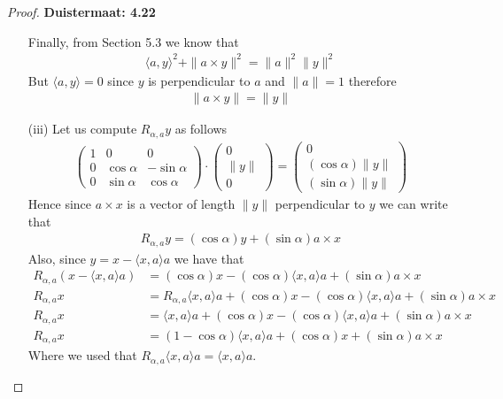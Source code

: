 \documentclass[11pt]{article}
\theoremstyle{definition}
\begin{document}
\begin{proof}{\textbf{Duistermaat: 4.22}}
\begin{itemize}
    Finally, from Section 5.3 we know that
    \begin{align*}
        \langle a, y \rangle^2 + \|a \times y\|^2 = \|a\|^2\|y\|^2
    \end{align*}
    But $\langle a, y \rangle = 0$ since $y$ is perpendicular to $a$ and
    $\|a\| = 1$ therefore
    \begin{align*}
        \|a \times y\| = \|y\|
    \end{align*}
    \item [(iii)] Let us compute $R_{\alpha, a} y$ as follows
    \begin{align*}
        \begin{pmatrix}
            1 & 0 & 0\\
            0 & \cos\alpha & -\sin\alpha\\
            0 & \sin\alpha & \cos\alpha
        \end{pmatrix}
        \cdot \begin{pmatrix}
            0 \\ \|y\| \\ 0
        \end{pmatrix}
        = \begin{pmatrix}
            0 \\ (\cos\alpha) \|y\| \\ (\sin\alpha) \|y\|
        \end{pmatrix}
    \end{align*}
    Hence since $a \times x$ is a vector of length $\|y\|$ perpendicular to $y$
    we can write that
    \begin{align*}
        R_{\alpha,a} y = (\cos\alpha)y + (\sin\alpha)a \times x
    \end{align*}
    Also, since $y =  x - \langle x, a\rangle a$ we have that
    \begin{align*}
        R_{\alpha,a} (x - \langle x, a\rangle a)
        &= (\cos\alpha)x - (\cos\alpha)\langle x, a\rangle a + (\sin\alpha)a \times x\\
        R_{\alpha,a} x &= R_{\alpha,a} \langle x, a\rangle a + 
        (\cos\alpha)x - (\cos\alpha)\langle x, a\rangle a + (\sin\alpha)a \times x\\
        R_{\alpha,a} x &= \langle x, a\rangle a + 
        (\cos\alpha)x - (\cos\alpha)\langle x, a\rangle a + (\sin\alpha)a \times x\\
        R_{\alpha,a} x
        &= (1 - \cos\alpha)\langle x, a\rangle a + (\cos\alpha)x + (\sin\alpha)a \times x
    \end{align*}
    Where we used that $R_{\alpha,a} \langle x, a\rangle a = \langle x, a\rangle a$.


\end{itemize}
\end{proof}
\end{document}
